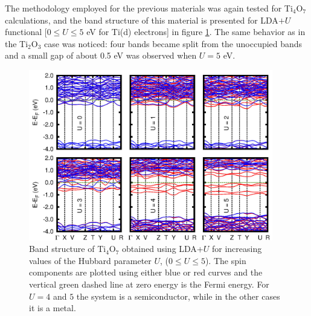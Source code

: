 The methodology employed for the previous materials was again tested for Ti$_4$O$_7$ calculations, and the band structure of this material is presented for LDA$+U$ functional [$0 \leq U \leq 5$ eV for Ti(d) electrons] in figure \ref{fig:bands-ti4o7}. The same behavior as in the Ti$_2$O$_3$ case was noticed: four bands became split from the unoccupied bands and a small gap of about 0.5 eV was observed when $U = 5$ eV.
\begin{figure}[!ht]
\centering
  \includegraphics[width=0.95\textwidth]{img/bands-ti4o7.jpg}
  \caption{Band structure of Ti$_4$O$_7$ obtained using LDA+$U$ for increasing values of the Hubbard parameter $U$, ($0 \leq U \leq 5$). The spin components are plotted using either blue or red curves and the vertical green dashed line at zero energy is the Fermi energy. For $U = 4$ and $5$ the system is a semiconductor, while in the other cases it is a metal.} 
  \label{fig:bands-ti4o7}
\end{figure}

